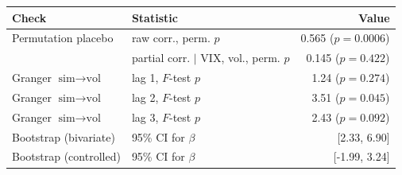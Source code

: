 \begin{tabular}{llr}
\toprule
Check & Statistic & Value \\
\midrule
Permutation placebo & raw corr., perm. $p$ & 0.565 ($p=0.0006$) \\
 & partial corr. $\mid$ VIX, vol., perm. $p$ & 0.145 ($p=0.422$) \\
Granger $\text{sim}\to\text{vol}$ & lag 1, $F$-test $p$ & 1.24 ($p=0.274$) \\
Granger $\text{sim}\to\text{vol}$ & lag 2, $F$-test $p$ & 3.51 ($p=0.045$) \\
Granger $\text{sim}\to\text{vol}$ & lag 3, $F$-test $p$ & 2.43 ($p=0.092$) \\
Bootstrap (bivariate) & 95\% CI for $\beta$ & [2.33, 6.90] \\
Bootstrap (controlled) & 95\% CI for $\beta$ & [-1.99, 3.24] \\
\bottomrule
\end{tabular}